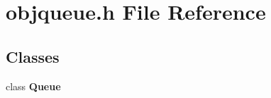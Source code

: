 \section{objqueue.\+h File Reference}
\label{objqueue_8h}
\subsection*{Classes}
\begin{DoxyCompactItemize}
\item 
class {\bf Queue}
\end{DoxyCompactItemize}
